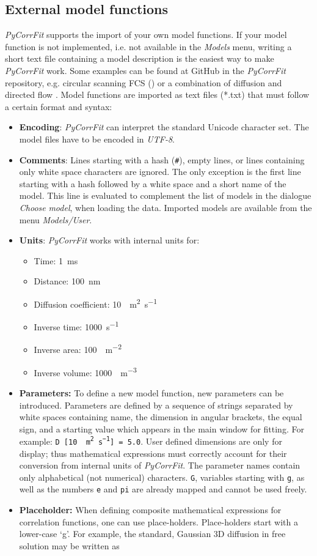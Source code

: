 \subsection{External model functions}
\label{sec:hacke.extmod}
\textit{PyCorrFit} supports the import of your own model functions. If your model function is not implemented, i.e. not available in the \textit{Models} menu, writing a short text file containing a model description is the easiest way to make \textit{PyCorrFit} work.
Some examples can be found at GitHub in the \textit{PyCorrFit} repository, e.g. circular scanning FCS \cite{Petrasek2008} () or a combination of diffusion and directed flow \cite{Brinkmeier1999}. Model functions are imported as text files (*.txt) that must follow a certain format and syntax:
\begin{itemize}
\item \textbf{Encoding}: \textit{PyCorrFit} can interpret the standard Unicode character set. The model files have to be encoded in \textit{UTF-8}.
\item \textbf{Comments}: Lines starting with a hash (\texttt{\#}), empty lines, or lines containing only white space characters are ignored. The only exception is the first line starting with a hash followed by a white space and a short name of the model. This line is evaluated to complement the list of models in the dialogue\textit{ Choose }\textit{model}, when loading the data. Imported models are available from the menu \textit{Models/User}.
\item \textbf{Units}: \textit{PyCorrFit} works with internal units for:
\begin{itemize}
\item Time: \SI{1}{ms}
\item Distance: \SI{100}{nm}
\item Diffusion coefficient: \SI{10}{\mu m^2s^{-1}} 
\item Inverse time: \SI{1000}{s^{-1}} 
\item Inverse area: \SI{100}{\mu m^{-2}} 
\item Inverse volume: \SI{1000}{\mu m^{-3}} 
\end{itemize}
\item \textbf{Parameters:} To define a new model function, new parameters can be introduced. Parameters are defined by a sequence of strings separated by white spaces containing name, the dimension in angular brackets, the equal sign, and a starting value which appears in the main window for fitting. For example: \texttt{D [\SI{10}{\mu m^ 2 s^{-1}}] = 5.0}. User defined dimensions are only for display; thus mathematical expressions must correctly account for their conversion from internal units of \textit{PyCorrFit}. The parameter names contain only alphabetical (not numerical) characters. \texttt{G}, variables starting with \texttt{g}, as well as the numbers \texttt{e} and \texttt{pi} are already mapped and cannot be used freely.
\item \textbf{Placeholder:} When defining composite mathematical expressions for correlation functions, one can use place-holders. Place-holders start with a lower-case ‘g’. For example, the standard, Gaussian 3D diffusion in free solution may be written as


\end{itemize}
